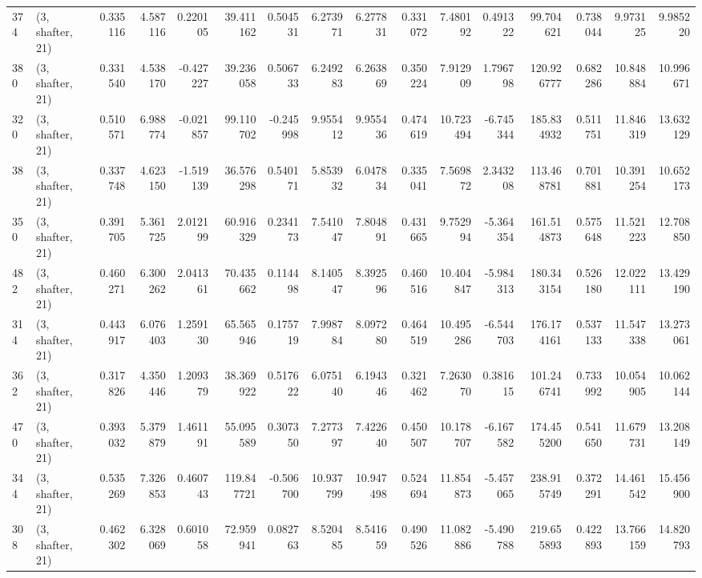 \begin{tabular}{llrrrrrrrrrrrrrr}
374 &  (3, shafter, 21) &   0.335116 &   4.587116 &   0.220105 &    39.411162 &   0.504531 &   6.273971 &   6.277831 &  0.331072 &   7.480192 &   0.491322 &    99.704621 &  0.738044 &   9.973125 &   9.985220 \\
380 &  (3, shafter, 21) &   0.331540 &   4.538170 &  -0.427227 &    39.236058 &   0.506733 &   6.249283 &   6.263869 &  0.350224 &   7.912909 &   1.796798 &   120.926777 &  0.682286 &  10.848884 &  10.996671 \\
320 &  (3, shafter, 21) &   0.510571 &   6.988774 &  -0.021857 &    99.110702 &  -0.245998 &   9.955412 &   9.955436 &  0.474619 &  10.723494 &  -6.745344 &   185.834932 &  0.511751 &  11.846319 &  13.632129 \\
38  &  (3, shafter, 21) &   0.337748 &   4.623150 &  -1.519139 &    36.576298 &   0.540171 &   5.853932 &   6.047834 &  0.335041 &   7.569872 &   2.343208 &   113.468781 &  0.701881 &  10.391254 &  10.652173 \\
350 &  (3, shafter, 21) &   0.391705 &   5.361725 &   2.012199 &    60.916329 &   0.234173 &   7.541047 &   7.804891 &  0.431665 &   9.752994 &  -5.364354 &   161.514873 &  0.575648 &  11.521223 &  12.708850 \\
482 &  (3, shafter, 21) &   0.460271 &   6.300262 &   2.041361 &    70.435662 &   0.114498 &   8.140547 &   8.392596 &  0.460516 &  10.404847 &  -5.984313 &   180.343154 &  0.526180 &  12.022111 &  13.429190 \\
314 &  (3, shafter, 21) &   0.443917 &   6.076403 &   1.259130 &    65.565946 &   0.175719 &   7.998784 &   8.097280 &  0.464519 &  10.495286 &  -6.544703 &   176.174161 &  0.537133 &  11.547338 &  13.273061 \\
362 &  (3, shafter, 21) &   0.317826 &   4.350446 &   1.209379 &    38.369922 &   0.517622 &   6.075140 &   6.194346 &  0.321462 &   7.263070 &   0.381615 &   101.246741 &  0.733992 &  10.054905 &  10.062144 \\
470 &  (3, shafter, 21) &   0.393032 &   5.379879 &   1.461191 &    55.095589 &   0.307350 &   7.277397 &   7.422640 &  0.450507 &  10.178707 &  -6.167582 &   174.455200 &  0.541650 &  11.679731 &  13.208149 \\
344 &  (3, shafter, 21) &   0.535269 &   7.326853 &   0.460743 &   119.847721 &  -0.506700 &  10.937799 &  10.947498 &  0.524694 &  11.854873 &  -5.457065 &   238.915749 &  0.372291 &  14.461542 &  15.456900 \\
308 &  (3, shafter, 21) &   0.462302 &   6.328069 &   0.601058 &    72.959941 &   0.082763 &   8.520485 &   8.541659 &  0.490526 &  11.082886 &  -5.490788 &   219.655893 &  0.422893 &  13.766159 &  14.820793 \\

\end{tabular}
